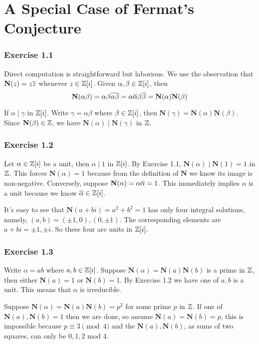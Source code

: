 \documentclass[../Marcus.tex]{subfiles}
\begin{document}
\chapter{A Special Case of Fermat's Conjecture}

\subsection*{Exercise 1.1}

Direct computation is straightforward but laborious. We use the observation that $\mathbf{N}(z)=z\overline{z}$ whenever $z\in\mathbb{Z}[i]$. Given $\alpha,\beta\in\mathbb{Z}[i]$, then $$\mathbf{N}(\alpha\beta)=\alpha\beta\overline{\alpha\beta}=\alpha\overline{\alpha}\beta\overline{\beta}=\mathbf{N}(\alpha)\mathbf{N}(\beta)$$

If $\alpha\mid\gamma$ in $\mathbb{Z}[i]$. Write $\gamma=\alpha\beta$ where $\beta\in\mathbb{Z}[i]$, then $\mathbf{N}(\gamma)=\mathbf{N}(\alpha)\mathbf{N}(\beta)$. Since $\mathbf{N}(\beta)\in\mathbb{Z}$, we have $\mathbf{N}(\alpha)\mid\mathbf{N}(\gamma)$ in $\mathbb{Z}$.

\subsection*{Exercise 1.2}

Let $\alpha\in\mathbb{Z}[i]$ be a unit, then $\alpha\mid 1$ in $\mathbb{Z}[i]$. By Exercise 1.1, $\mathbf{N}(\alpha)\mid \mathbf{N}(1)=1$ in $\mathbb{Z}$. This forces $\mathbf{N}(\alpha)=1$ because from the definition of $\mathbf{N}$ we know its image is non-negative. Conversely, suppose $\mathbf{N}(\alpha)=\alpha\overline{\alpha}=1$. This immediately implies $\alpha$ is a unit because we know $\overline{\alpha}\in\mathbb{Z}[i]$.

It's easy to see that $\mathbf{N}(a+bi)=a^2+b^2=1$ has only four integral solutions, namely, $(a,b)=(\pm1,0),(0,\pm1)$. The corresponding elements are $a+bi=\pm1,\pm i$. So these four are units in $\mathbb{Z}[i]$.

\subsection*{Exercise 1.3}

Write $\alpha=ab$ where $a,b\in\mathbb{Z}[i]$. Suppose $\mathbf{N}(\alpha)=\mathbf{N}(a)\mathbf{N}(b)$ is a prime in $\mathbb{Z}$, then either $\mathbf{N}(a)=1$ or $\mathbf{N}(b)=1$. By Exercise 1.2 we have one of $a,b$ is a unit. This means that $\alpha$ is irreducible.

Suppose $\mathbf{N}(\alpha)=\mathbf{N}(a)\mathbf{N}(b)=p^2$ for some prime $p$ in $\mathbb{Z}$. If one of $\mathbf{N}(a),\mathbf{N}(b)=1$ then we are done, so assume $\mathbf{N}(a)=\mathbf{N}(b)=p$, this is impossible because $p\equiv 3\pmod{4}$ and the $\mathbf{N}(a),\mathbf{N}(b)$, as sums of two squares, can only be $0,1,2$ mod 4.
\end{document}
